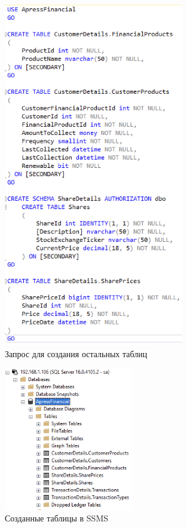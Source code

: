 \documentclass[a4paper, 14pt]{extarticle}
\begin{document}
\begin{figure}[H]
  \centering
  \includegraphics[width=0.7\textwidth]{images/task-5/1.png}
  \caption{Запрос для создания остальных таблиц}
  \label{fig:task-5-1}
\end{figure}

\begin{figure}[H]
  \centering
  \includegraphics[width=0.5\textwidth]{images/task-5/2.png}
  \caption{Созданные таблицы в SSMS}
  \label{fig:task-5-2}
\end{figure}
\end{document}
